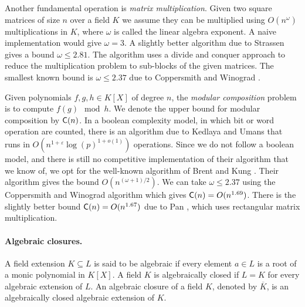 Another fundamental operation is \textit{matrix multiplication}. Given two square matrices of size 
$n$ over a field $K$ we assume they can be multiplied using $O(n^\omega)$ multiplications in $K$, 
where $\omega$ is called the linear algebra exponent. A naive implementation would give $\omega = 
3$. A slightly better algorithm due to Strassen \cite{Strassen1969} gives a bound $\omega \le 2.81$.
The algorithm uses a divide and conquer approach to reduce the multiplication problem to sub-blocks 
of the given matrices. The smallest known bound is $\omega \le 2.37$ due to Coppersmith and 
Winograd \cite{CoWi90}. 

Given polynomials $f, g, h \in K[X]$ of degree $n$, the \textit{modular composition} problem is to 
compute $f(g) \mod{h}$. We denote the upper bound for modular composition by $\mathsf{C}(n)$. In a boolean 
complexity model, in which bit or word operation are counted, there is an algorithm due to 
Kedlaya and Umans \cite{KeUm11, Umans08} that runs in $O(n^{1+\varepsilon}\log(p)^{1+o(1)})$ 
operations. Since we do not follow a boolean model, and there is still no competitive  
implementation of their algorithm that we know of, we opt for the well-known algorithm of Brent and 
Kung \cite{BrKu78}. Their algorithm gives the bound $O(n^{(\omega+1)/2})$. We can take $\omega \le 
2.37$ using the Coppersmith and Winograd algorithm which gives $\mathsf{C}(n)=O(n^{1.69})$. There is the 
slightly better bound $\mathsf{C}(n)=O(n^{1.67})$ due to Pan \cite{HuPa98}, which uses rectangular matrix 
multiplication.

\paragraph{Algebraic closures.}
A field extension $K \subseteq L$ is said to be algebraic if every element $a \in L$ is a root of a 
monic polynomial in $K[X]$. A field $K$ is algebraically closed if $L = K$ for every algebraic 
extension of $L$. An algebraic closure of a field $K$, denoted by $\overline{K}$, is an 
algebraically closed algebraic extension of $K$. 

